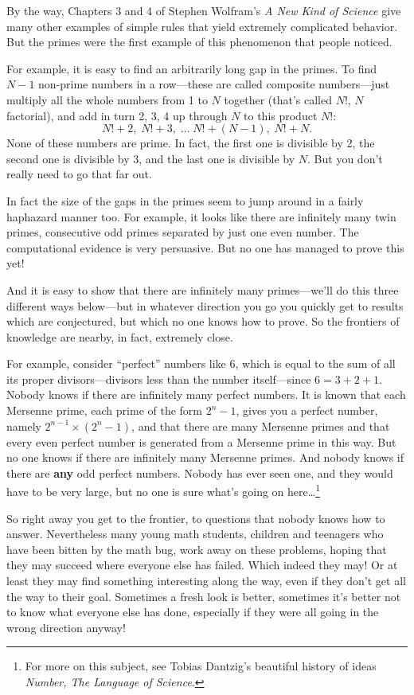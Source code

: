 \documentclass[12pt]{book}
\begin{document}
By the way,
Chapters 3 and 4 of Stephen Wolfram's \emph{A New Kind of Science} give many other examples 
of simple rules that yield extremely complicated behavior.
But the primes were the first example of this phenomenon that people noticed.

For example,
it is easy to find an arbitrarily long gap in the primes.
To find $N - 1$ non-prime numbers in a row---these are called composite numbers---just multiply
all the whole numbers from 1 to $N$ together (that's called $N!$, $N$ factorial), and add in turn 2, 3,
4 up through $N$ to this product $N!$:
\[
   N! + 2, \; N! + 3, \; \ldots \; N! + (N-1), \; N! + N.
\]
None of these numbers are prime.
In fact, the first one is divisible by 2, the second one is divisible by 3, and the last one
is divisible by $N$.
But you don't really need to go that far out. 

In fact the size of the gaps in the primes seem to jump around in a fairly haphazard manner too.
For example, it looks like there are infinitely many twin primes, consecutive odd primes
separated by just one even number.  The computational evidence is very persuasive. But no
one has managed to prove this yet!

And it is easy to show that there are infinitely many primes---we'll do this three different ways
below---but in whatever direction you go you quickly get to results which are conjectured, but
which no one knows how to prove.
So the frontiers of knowledge are nearby, in fact, extremely close.

For example, consider ``perfect'' numbers like 6, which is equal to the sum of all its proper
divisors---divisors less than the number itself---since $6 = 3 + 2 + 1$. 
Nobody knows if there are infinitely many perfect numbers.
It is known that each Mersenne prime, each prime of the form $2^n - 1$, gives you
a perfect number, namely $2^{n - 1} \times (2^n - 1)$, 
and that there are many Mersenne primes
and that every even perfect number is generated from a Mersenne prime in this way. But no one
knows if there are infinitely many Mersenne primes.
And nobody knows if there are \textbf{any} odd perfect numbers. Nobody has ever seen one, and
they would have to be very large, but no one is sure what's going on here\ldots\footnote
{For more on this subject, see Tobias Dantzig's beautiful history of ideas 
\emph{Number, The Language of Science}.}

So right away you get to the frontier, to questions that nobody knows how to answer.
Nevertheless many young math students, children and teenagers who have been bitten by the math 
bug, work away on these problems, hoping that they may succeed where everyone else has failed.
Which indeed they may! 
Or at least they may find something interesting along the way, 
even if they don't get all the way to their goal.
Sometimes a fresh look is better, sometimes it's better not to know what everyone else has done,
especially if they were all going in the wrong direction anyway!
\end{document}
